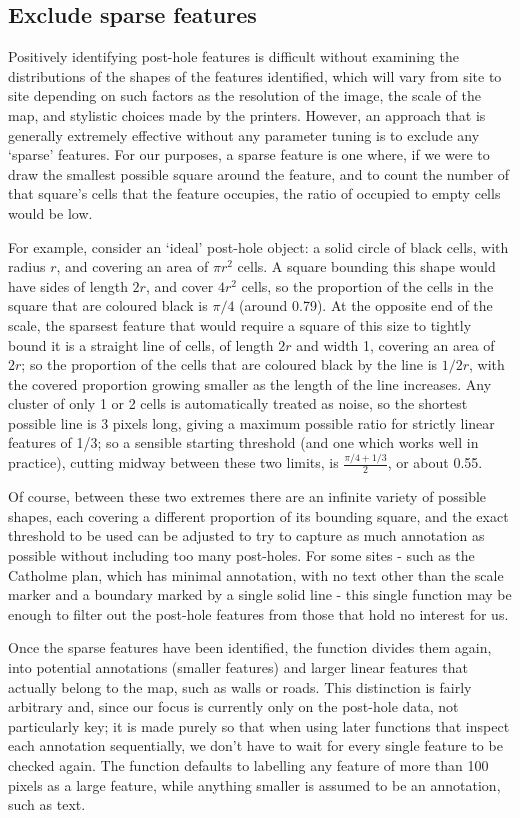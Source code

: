 \documentclass[10pt,fleqn]{article}
\begin{document}
\subsection{Exclude sparse features}
Positively identifying post-hole features is difficult without examining the distributions of the shapes of the features identified, which will vary from site to site depending on such factors as the resolution of the image, the scale of the map, and stylistic choices made by the printers. However, an approach that is generally extremely effective without any parameter tuning is to exclude any `sparse' features. For our purposes, a sparse feature is one where, if we were to draw the smallest possible square around the feature, and to count the number of that square's cells that the feature occupies, the ratio of occupied to empty cells would be low.

For example, consider an `ideal' post-hole object: a solid circle of black cells, with radius $r$, and covering an area of $\pi r^2$ cells. A square bounding this shape would have sides of length $2r$, and cover $4r^2$ cells, so the proportion of the cells in the square that are coloured black is $\pi/4$ (around 0.79). At the opposite end of the scale, the sparsest feature that would require a square of this size to tightly bound it is a straight line of cells, of length $2r$ and width 1, covering an area of $2r$; so the proportion of the cells that are coloured black by the line is $1/2r$, with the covered proportion growing smaller as the length of the line increases. Any cluster of only 1 or 2 cells is automatically treated as noise, so the shortest possible line is 3 pixels long, giving a maximum possible ratio for strictly linear features of 1/3; so a sensible starting threshold (and one which works well in practice), cutting midway between these two limits, is $\frac{\pi/4+1/3}{2}$, or about 0.55. 

Of course, between these two extremes there are an infinite variety of possible shapes, each covering a different proportion of its bounding square, and the exact threshold to be used can be adjusted to try to capture as much annotation as possible without including too many post-holes. For some sites - such as the Catholme plan, which has minimal annotation, with no text other than the scale marker and a boundary marked by a single solid line - this single function may be enough to filter out the post-hole features from those that hold no interest for us.

Once the sparse features have been identified, the function divides them again, into potential annotations (smaller features) and larger linear features that actually belong to the map, such as walls or roads. This distinction is fairly arbitrary and, since our focus is currently only on the post-hole data, not particularly key; it is made purely so that when using later functions that inspect each annotation sequentially, we don't have to wait for every single feature to be checked again. The function defaults to labelling any feature of more than 100 pixels as a large feature, while anything smaller is assumed to be an annotation, such as text.
\end{document}
